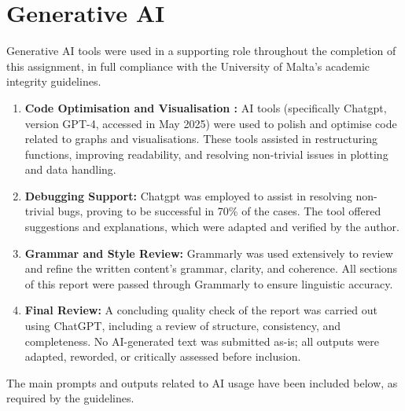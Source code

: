 \documentclass[conference]{IEEEtran}
\begin{document}
	\section*{Generative AI}
	
	Generative AI tools were used in a supporting role throughout the completion of this assignment, in full compliance with the University of Malta's academic integrity guidelines.
	
	\begin{enumerate}
		\item \textbf{Code Optimisation and Visualisation :} AI tools (specifically Chatgpt, version GPT-4, accessed in May 2025) were used to polish and optimise code related to graphs and visualisations. These tools assisted in restructuring functions, improving readability, and resolving non-trivial issues in plotting and data handling.
		
		\item \textbf{Debugging Support:} Chatgpt was employed to assist in resolving non-trivial bugs, proving to be successful in 70\% of the cases. The tool offered suggestions and explanations, which were adapted and verified by the author.
		
		\item \textbf{Grammar and Style Review:} Grammarly was used extensively to review and refine the written content's grammar, clarity, and coherence. All sections of this report were passed through Grammarly to ensure linguistic accuracy.
		
		\item \textbf{Final Review:} A concluding quality check of the report was carried out using ChatGPT, including a review of structure, consistency, and completeness. No AI-generated text was submitted as-is; all outputs were adapted, reworded, or critically assessed before inclusion.
	\end{enumerate}
	
	The main prompts and outputs related to AI usage have been included below, as required by the guidelines.
\end{document}
